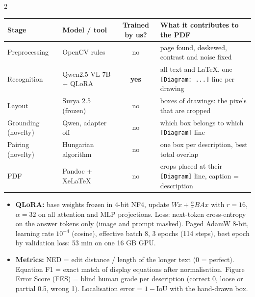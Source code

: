 \documentclass[a0,portrait]{a0poster}
\begin{document}
\begin{minipage}[c]{\linewidth}
\begin{framed}
\begin{multicols}{2}
\begin{center}
{\begin{tabular}{|l|l|c|l|}
\hline
\textbf{Stage} & \textbf{Model / tool} & \textbf{Trained by us?} & \textbf{What it contributes to the PDF} \\
\hline
Preprocessing & OpenCV rules & no & page found, deskewed, contrast and noise fixed \\
Recognition & Qwen2.5-VL-7B + QLoRA & \textbf{yes} & all text and \LaTeX, one \texttt{[Diagram: ...]} line per drawing \\
Layout & Surya 2.5 (frozen) & no & boxes of drawings: the pixels that are cropped \\
Grounding (novelty) & Qwen, adapter off & no & which box belongs to which \texttt{[Diagram]} line \\
Pairing (novelty) & Hungarian algorithm & no & one box per description, best total overlap \\
PDF & Pandoc + XeLaTeX & no & crops placed at their \texttt{[Diagram]} line, caption = description \\
\hline
\end{tabular}}
\end{center}
\begin{itemize}
	\item \textbf{QLoRA:} base weights frozen in 4-bit NF4, update $W x + \tfrac{\alpha}{r} B A x$ with
	$r=16$, $\alpha=32$ on all attention and MLP projections. Loss: next-token cross-entropy on the
	answer tokens only (image and prompt masked). Paged AdamW 8-bit, learning rate $10^{-4}$ (cosine),
	effective batch 8, 3 epochs (114 steps), best epoch by validation loss: 53 min on one 16 GB GPU.
	\item \textbf{Metrics:} NED = edit distance / length of the longer text (0 = perfect). Equation F1
	= exact match of display equations after normalisation. Figure Error Score (FES) = blind human grade
	per description (correct 0, loose or partial 0.5, wrong 1). Localisation error = $1 - \mathrm{IoU}$
	with the hand-drawn box.
\end{itemize}


\end{multicols}
\end{framed}
\end{minipage}
\end{document}
